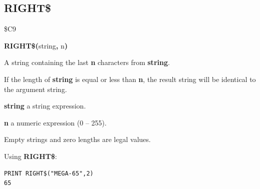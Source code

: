 
\newpage
\subsection{RIGHT\$}
\begin{description}[leftmargin=2cm,style=nextline]
\item [Token:] \$C9
\item [Format:] {\bf RIGHT\$(}string{\bf,} n{\bf)}
\item [Returns:] A string containing the last {\bf n} characters from {\bf string}.

               If the length of {\bf string} is equal or less than {\bf n},
               the result string will be identical to the argument string.

               {\bf string} a string expression.

               {\bf n} a numeric expression (0 -- 255).

\item [Remarks:] Empty strings and zero lengths are legal values.

\item [Example:] Using {\bf RIGHT\$}:
\begin{tcolorbox}[colback=black,coltext=white]
\verbatimfont{\codefont}
\begin{verbatim}
PRINT RIGHT$("MEGA-65",2)
65
\end{verbatim}
\end{tcolorbox}
\end{description}


\newpage
